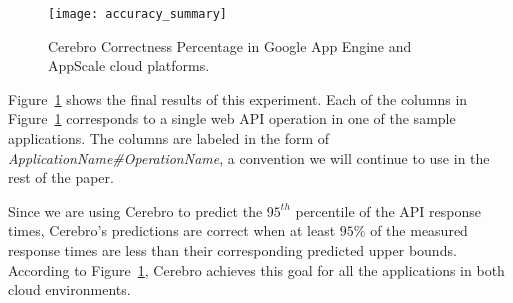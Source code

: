 
\begin{figure}
\centering
\texttt{[image: accuracy\_summary]}
\caption{Cerebro Correctness Percentage in Google App Engine and AppScale cloud platforms.}
\label{fig:accuracy_summary}
\vspace{-0.2in}
\end{figure}

Figure~\ref{fig:accuracy_summary} shows the final results of this experiment.
Each of the columns in Figure~\ref{fig:accuracy_summary} corresponds 
to a single web API operation in 
one of the sample applications. The columns are labeled in the 
form of \textit{ApplicationName\#OperationName}, a convention 
we will continue to use in the rest of the paper. %

Since we are using Cerebro to predict the $95^{th}$ percentile of the API
response times, Cerebro's predictions are correct when at 
least $95\%$ of the measured response times are
less than their corresponding predicted upper bounds. According to
Figure~\ref{fig:accuracy_summary}, Cerebro achieves this goal for all the
applications in both cloud environments. 

